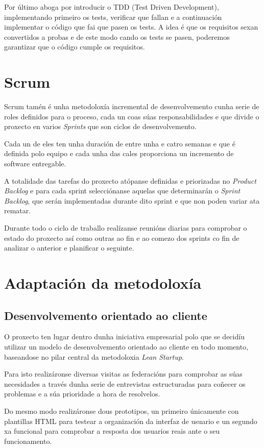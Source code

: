   Por último aboga por introducir o TDD (Test Driven Development), 
implementando primeiro os tests, verificar que fallan e a continuación 
implementar o código que fai que pasen os tests.
  A idea é que os requisitos sexan convertidos a probas e de este modo cando os 
tests se pasen, poderemos garantizar que o código cumple os requisitos.

  \section{Scrum}
  Scrum tamén é unha metodoloxía incremental de desenvolvemento cunha serie de 
roles definidos para o proceso, cada un coas súas responsabilidades e que divide 
o proxecto en varios \emph{Sprints} que son ciclos de desenvolvemento.

  Cada un de eles ten unha duración de entre unha e catro semanas e que é 
definida polo equipo e cada unha das cales proporciona un incremento de 
software entregable.

  A totalidade das tarefas do proxecto atópanse definidas e priorizadas no 
\emph{Product Backlog} e para cada sprint selecciónanse aquelas que determinarán 
o \emph{Sprint Backlog}, que serán implementadas durante dito sprint e que non 
poden variar ata rematar.

  Durante todo o ciclo de traballo realízanse reunións diarias para comprobar o 
estado do proxecto así como outras ao fin e ao comezo dos sprints co fin de 
analizar o anterior e planificar o seguinte.

  \section{Adaptación da metodoloxía}

    \subsection{Desenvolvemento orientado ao cliente}
      O proxecto ten lugar dentro dunha iniciativa empresarial polo que se 
decidíu utilizar un modelo de desenvolvemento orientado ao cliente en todo 
momento, baseandose no pilar central da metodoloxia \emph{Lean Startup}.

    Para isto realizáronse diversas visitas as federacións para comprobar as 
súas necesidades a través dunha serie de entrevistas estructuradas para 
coñecer os problemas e a súa prioridade a hora de resolvelos.

    Do mesmo modo realizáronse dous prototipos, un primeiro únicamente 
con plantillas HTML para testear a organización da interfaz de usuario e un 
segundo xa funcional para comprobar a resposta dos usuarios reais ante o seu 
funcionamento.

